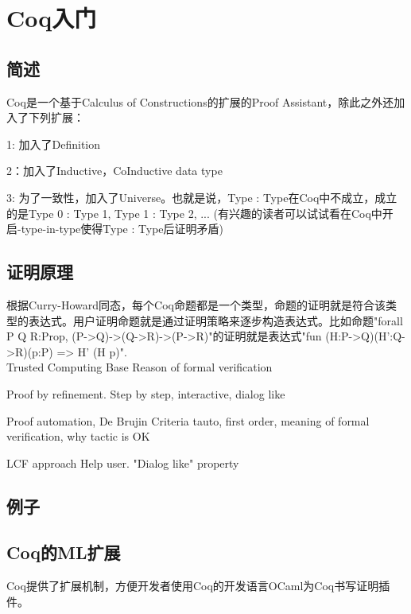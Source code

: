 \section{Coq入门}

\subsection{简述}
Coq是一个基于Calculus of Constructions的扩展的Proof Assistant，除此之外还加入了下列扩展：

1: 加入了Definition

2：加入了Inductive，CoInductive data type

3: 为了一致性，加入了Universe。也就是说，Type : Type在Coq中不成立，成立的是Type 0 : Type 1, Type 1 : Type 2, ... (有兴趣的读者可以试试看在Coq中开启-type-in-type使得Type : Type后证明矛盾)

\subsection{证明原理}
根据Curry-Howard同态，每个Coq命题都是一个类型，命题的证明就是符合该类型的表达式。用户证明命题就是通过证明策略来逐步构造表达式。比如命题"forall P Q R:Prop, (P->Q)->(Q->R)->(P->R)"的证明就是表达式"fun (H:P->Q)(H’:Q->R)(p:P) => H’ (H p)".\\

Trusted Computing Base
Reason of formal verification

Proof by refinement.
Step by step, interactive, dialog like

Proof automation, De Brujin Criteria
tauto, first order, meaning of formal verification, why tactic is OK

LCF approach
Help user. "Dialog like" property

\subsection{例子}

\subsection{Coq的ML扩展}
Coq提供了扩展机制，方便开发者使用Coq的开发语言OCaml为Coq书写证明插件。

